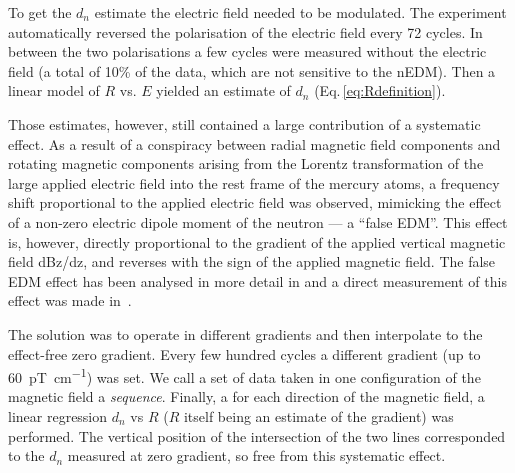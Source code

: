 To get the $d_n$ estimate the electric field needed to be modulated. The experiment automatically reversed the polarisation of the electric field every 72 cycles. In between the two polarisations a few cycles were measured without the electric field (a total of 10\% of the data, which are not sensitive to the nEDM). Then a linear model of  $R$ vs. $E$ yielded an estimate of $d_n$ (Eq.\,\ref{eq:Rdefinition}).

Those estimates, however, still contained a large contribution of a systematic effect. As a result of a conspiracy between radial magnetic field components and rotating magnetic components arising from the Lorentz transformation of the large applied electric field into the rest frame of the mercury atoms, a frequency shift proportional to the applied electric field was observed, mimicking the effect of a non-zero electric dipole moment of the neutron --- a “false EDM”. This effect is, however, directly proportional to the gradient of the applied vertical magnetic field dBz/dz, and reverses with the sign of the applied magnetic field. The false EDM effect has been analysed in more detail in \cite{Pendlebury2004,PhysRevA.71.032104,PhysRevA.73.014101} and a direct measurement of this effect was made in~\cite{Afach2015falseEDM}. 

The solution was to operate in different gradients and then interpolate to the effect-free zero gradient. Every few hundred cycles a different gradient (up to \SI{60}{\pico\tesla\per\centi\meter}) was set.
We call a set of data taken in one configuration of the magnetic field a \emph{sequence}. Finally, a for each direction of the magnetic field, a linear regression $d_n$ vs $R$ ($R$ itself being an estimate of the gradient) was performed. The vertical position of the intersection of the two lines corresponded to the $d_n$ measured at zero gradient, so free from this systematic effect.


